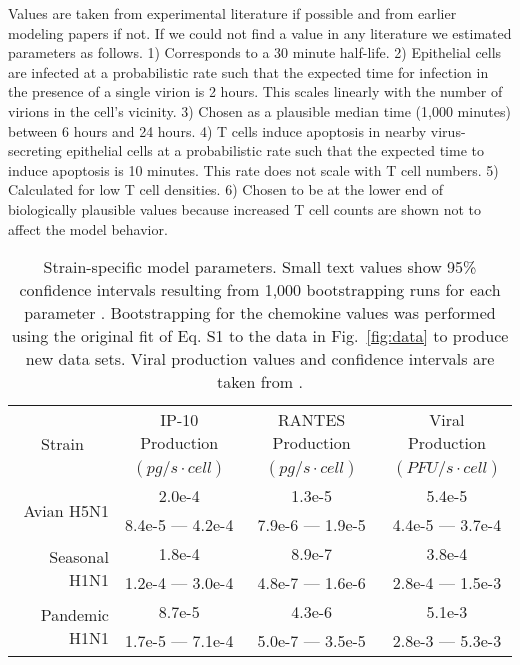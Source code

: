 \documentclass[10pt]{article}
\begin{document}
\begin{table}
\begin{center}
\caption{Values are taken from experimental literature if possible and from earlier modeling papers if not.  If we could not find a value in any literature we estimated parameters as follows.  1) Corresponds to a 30 minute half-life.  2) Epithelial cells are infected at a probabilistic rate such that the expected time for infection in the presence of a single virion is 2 hours.  This scales linearly with the number of virions in the cell's vicinity.  3) Chosen as a plausible median time (1,000 minutes) between 6 hours and 24 hours.  4) T cells induce apoptosis in nearby virus-secreting epithelial cells at a probabilistic rate such that the expected time to induce apoptosis is 10 minutes.  This rate does not scale with T cell numbers.  5) Calculated for low T cell densities.  6) Chosen to be at the lower end of biologically plausible values because increased T cell counts are shown not to affect the model behavior. }
\label{tab:parameters}
\end{center}
\end{table}


\begin{table}
\centering
\begin{tabular}{ | r | c | c | c | }
  \hline                        
  \multicolumn{1}{|c|}{\multirow{2}{*}{Strain}} & IP-10 Production & RANTES Production & Viral Production \\
   & \footnotesize{$(pg/s\cdot cell)$}  & \footnotesize{$(pg/s\cdot cell)$} &  \footnotesize{$(PFU/s\cdot cell)$} \\
  \hline
  \multirow{2}{*}{Avian H5N1} & 2.0e-4 &  1.3e-5 & 5.4e-5 \\
   &  \footnotesize{8.4e-5 --- 4.2e-4} & \footnotesize{7.9e-6 --- 1.9e-5} & \footnotesize{4.4e-5 --- 3.7e-4}\\ 
   \hline
  \multirow{2}{*}{Seasonal H1N1} & 1.8e-4 &  8.9e-7 & 3.8e-4 \\
   & \footnotesize{1.2e-4 --- 3.0e-4} & \footnotesize{4.8e-7 --- 1.6e-6} & \footnotesize{2.8e-4 --- 1.5e-3}\\
   \hline
  \multirow{2}{*}{Pandemic H1N1} & 8.7e-5 &  4.3e-6 & 5.1e-3 \\
   & \footnotesize{1.7e-5 --- 7.1e-4} & \footnotesize{5.0e-7 --- 3.5e-5} & \footnotesize{2.8e-3 --- 5.3e-3} \\
  \hline
\end{tabular}
\caption{Strain-specific model parameters.  Small text values show 95\% confidence intervals resulting from 1,000 bootstrapping runs for each parameter \cite{Wu1986}.  Bootstrapping for the chemokine values was performed using the original fit of Eq. S1 to the data in Fig.~\ref{fig:data} to produce new data sets.  Viral production values and confidence intervals are taken from \cite{Mitchell2011}.}
\label{tab:strains}
\end{table}
\end{document}
